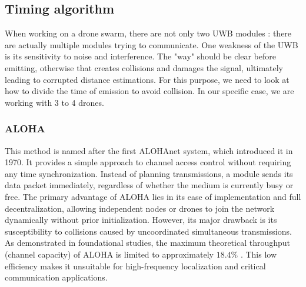 \subsection{Timing algorithm}\label{UWB_Algo_timings}
When working on a drone swarm, there are not only two UWB modules : there are actually multiple modules trying to communicate. One weakness of the UWB is its sensitivity to noise and interference. The "way" should be clear before emitting, otherwise that creates collisions and damages the signal, ultimately leading to corrupted distance estimations. For this purpose, we need to look at how to divide the time of emission to avoid collision. In our specific case, we are working with 3 to 4 drones.
\subsubsection{ALOHA}
This method is named after the first ALOHAnet system, which introduced it in 1970. It provides a simple approach to channel access control without requiring any time synchronization. Instead of planning transmissions, a module sends its data packet immediately, regardless of whether the medium is currently busy or free.
The primary advantage of  ALOHA lies in its ease of implementation and full decentralization, allowing independent nodes or drones to join the network dynamically without prior initialization. 
However, its major drawback is its susceptibility to collisions caused by uncoordinated simultaneous transmissions. As demonstrated in foundational studies, the maximum theoretical throughput (channel capacity) of  ALOHA is limited to approximately $18.4\%$ \cite{noauthor_pdf_nodate}. This low efficiency makes it unsuitable for high-frequency localization and critical communication applications.


